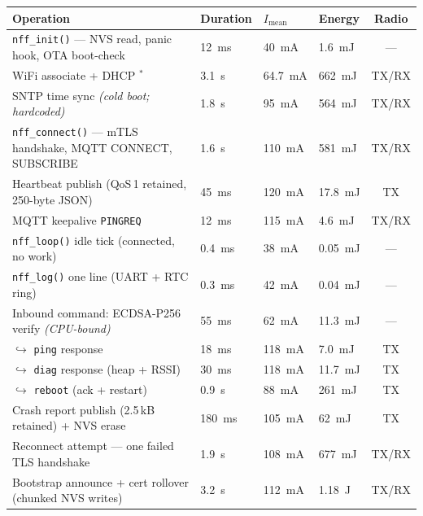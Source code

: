 \documentclass[11pt,a4paper]{article}
\newcommand{\meas}{\textcolor{ok}{$^{\ast}$}}
\begin{document}
\begin{center}
\begin{tabularx}{\textwidth}{Xlllc}
\toprule
\textbf{Operation} & \textbf{Duration} & \textbf{$I_\text{mean}$} & \textbf{Energy} & \textbf{Radio} \\
\midrule
\texttt{nff\_init()} --- NVS read, panic hook, OTA boot-check & \SI{12}{\milli\second} & \SI{40}{\milli\ampere} & \SI{1.6}{\milli\joule} & --- \\
WiFi associate + DHCP \meas                                    & \SI{3.1}{\second}       & \SI{64.7}{\milli\ampere}& \SI{662}{\milli\joule} & TX/RX \\
SNTP time sync \emph{(cold boot; hardcoded)}                   & \SI{1.8}{\second}       & \SI{95}{\milli\ampere} & \SI{564}{\milli\joule} & TX/RX \\
\texttt{nff\_connect()} --- mTLS handshake, MQTT CONNECT, SUBSCRIBE & \SI{1.6}{\second}  & \SI{110}{\milli\ampere}& \SI{581}{\milli\joule} & TX/RX \\
Heartbeat publish (QoS\,1 retained, 250-byte JSON)             & \SI{45}{\milli\second}  & \SI{120}{\milli\ampere}& \SI{17.8}{\milli\joule}& TX \\
MQTT keepalive \texttt{PINGREQ}                                & \SI{12}{\milli\second}  & \SI{115}{\milli\ampere}& \SI{4.6}{\milli\joule} & TX/RX \\
\texttt{nff\_loop()} idle tick (connected, no work)            & \SI{0.4}{\milli\second} & \SI{38}{\milli\ampere} & \SI{0.05}{\milli\joule}& --- \\
\texttt{nff\_log()} one line (UART + RTC ring)                 & \SI{0.3}{\milli\second} & \SI{42}{\milli\ampere} & \SI{0.04}{\milli\joule}& --- \\
\midrule
Inbound command: ECDSA-P256 verify \emph{(CPU-bound)}          & \SI{55}{\milli\second}  & \SI{62}{\milli\ampere} & \SI{11.3}{\milli\joule}& --- \\
\quad$\hookrightarrow$ \texttt{ping} response                  & \SI{18}{\milli\second}  & \SI{118}{\milli\ampere}& \SI{7.0}{\milli\joule} & TX \\
\quad$\hookrightarrow$ \texttt{diag} response (heap + RSSI)    & \SI{30}{\milli\second}  & \SI{118}{\milli\ampere}& \SI{11.7}{\milli\joule}& TX \\
\quad$\hookrightarrow$ \texttt{reboot} (ack + restart)         & \SI{0.9}{\second}       & \SI{88}{\milli\ampere} & \SI{261}{\milli\joule} & TX \\
\midrule
Crash report publish (2.5\,kB retained) + NVS erase            & \SI{180}{\milli\second} & \SI{105}{\milli\ampere}& \SI{62}{\milli\joule}  & TX \\
Reconnect attempt --- one failed TLS handshake                 & \SI{1.9}{\second}       & \SI{108}{\milli\ampere}& \SI{677}{\milli\joule} & TX/RX \\
Bootstrap announce + cert rollover (chunked NVS writes)        & \SI{3.2}{\second}       & \SI{112}{\milli\ampere}& \SI{1.18}{\joule}      & TX/RX \\
\bottomrule
\end{tabularx}
\end{center}
\end{document}
